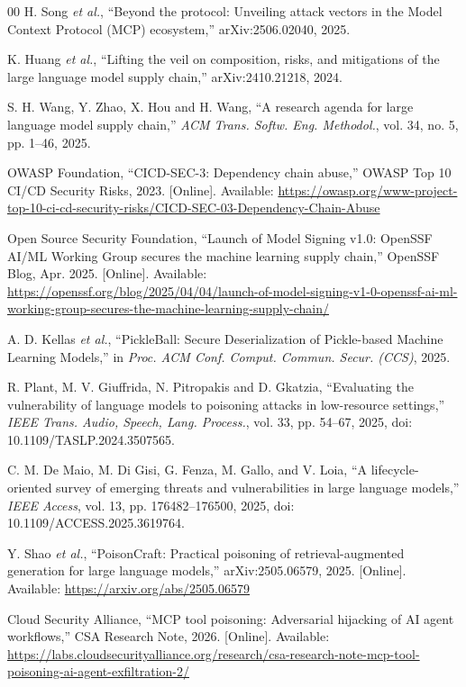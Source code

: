 \documentclass[conference]{IEEEtran}
\begin{document}
{\begin{thebibliography}{00}
H. Song \textit{et al.}, ``Beyond the protocol: Unveiling attack vectors in the Model Context Protocol (MCP) ecosystem,'' arXiv:2506.02040, 2025.

K. Huang \textit{et al.}, ``Lifting the veil on composition, risks, and mitigations of the large language model supply chain,'' arXiv:2410.21218, 2024.

S. H. Wang, Y. Zhao, X. Hou and H. Wang, ``A research agenda for large language model supply chain,'' \textit{ACM Trans. Softw. Eng. Methodol.}, vol. 34, no. 5, pp. 1--46, 2025.

OWASP Foundation, ``CICD-SEC-3: Dependency chain abuse,'' OWASP Top 10 CI/CD Security Risks, 2023. [Online]. Available: \url{https://owasp.org/www-project-top-10-ci-cd-security-risks/CICD-SEC-03-Dependency-Chain-Abuse}

Open Source Security Foundation, ``Launch of Model Signing v1.0: OpenSSF AI/ML Working Group secures the machine learning supply chain,'' OpenSSF Blog, Apr. 2025. [Online]. Available: \url{https://openssf.org/blog/2025/04/04/launch-of-model-signing-v1-0-openssf-ai-ml-working-group-secures-the-machine-learning-supply-chain/}

A. D. Kellas \textit{et al.}, ``PickleBall: Secure Deserialization of Pickle-based Machine Learning Models,'' in \textit{Proc. ACM Conf. Comput. Commun. Secur. (CCS)}, 2025.

R. Plant, M. V. Giuffrida, N. Pitropakis and D. Gkatzia, ``Evaluating the vulnerability of language models to poisoning attacks in low-resource settings,'' \textit{IEEE Trans. Audio, Speech, Lang. Process.}, vol. 33, pp. 54--67, 2025, doi: 10.1109/TASLP.2024.3507565.

C. M. De Maio, M. Di Gisi, G. Fenza, M. Gallo, and V. Loia, ``A lifecycle-oriented survey of emerging threats and vulnerabilities in large language models,'' \textit{IEEE Access}, vol. 13, pp. 176482--176500, 2025, doi: 10.1109/ACCESS.2025.3619764.

Y. Shao \textit{et al.}, ``PoisonCraft: Practical poisoning of retrieval-augmented generation for large language models,'' arXiv:2505.06579, 2025. [Online]. Available: \url{https://arxiv.org/abs/2505.06579}

Cloud Security Alliance, ``MCP tool poisoning: Adversarial hijacking of AI agent workflows,'' CSA Research Note, 2026. [Online]. Available: \url{https://labs.cloudsecurityalliance.org/research/csa-research-note-mcp-tool-poisoning-ai-agent-exfiltration-2/}


\end{thebibliography}}
\end{document}
